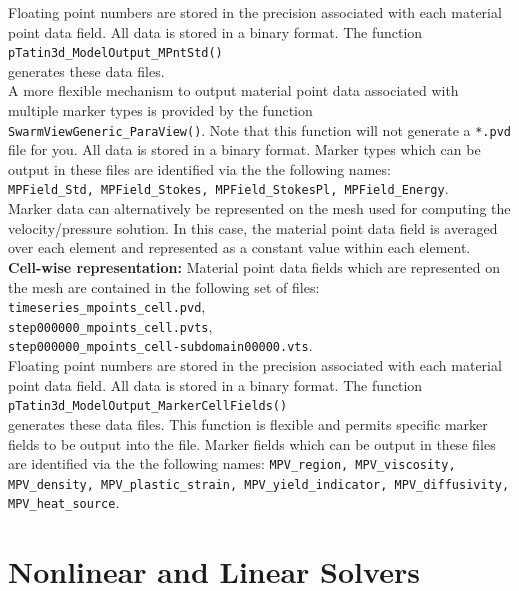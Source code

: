 \documentclass[paper=a4, fontsize=11pt,twoside]{scrartcl}
\newcommand{\unix}[1]{\texttt{\footnotesize #1}}
\begin{document}
{{Floating point numbers are stored in the precision associated with each material point data field. All data is stored in a binary format. The function \\
\unix{pTatin3d\_ModelOutput\_MPntStd()} \\
generates these data files.
\\[8pt]
A more flexible mechanism to output material point data associated with multiple marker types is provided by the function \unix{SwarmViewGeneric\_ParaView()}. Note that this function will not generate a \texttt{*.pvd} file for you.  All data is stored in a binary format. Marker types which can be output in these files are identified via the the following names: \\
\unix{MPField\_Std, MPField\_Stokes, MPField\_StokesPl, MPField\_Energy}.
\\[8pt]
Marker data can alternatively be represented on the mesh used for computing the velocity/pressure solution. 
In this case, the material point data field is averaged over each element and represented as a constant value within each element.
\\[8pt]
{\bf Cell-wise representation:} Material point data fields which are represented on the mesh are contained in the following set of files:\\
\unix{timeseries\_mpoints\_cell.pvd}, \\
\unix{step000000\_mpoints\_cell.pvts}, \\
\unix{step000000\_mpoints\_cell-subdomain00000.vts}. \\
Floating point numbers are stored in the precision associated with each material point data field. All data is stored in a binary format.
The function \\
	\unix{pTatin3d\_ModelOutput\_MarkerCellFields()} \\
generates these data files. This function is flexible and permits specific marker fields to be output into the file. Marker fields which can be output in these files are identified via the the following names:
\unix{MPV\_region, MPV\_viscosity, MPV\_density, MPV\_plastic\_strain, MPV\_yield\_indicator, MPV\_diffusivity, MPV\_heat\_source}.

\newpage
\section{Nonlinear and Linear Solvers}

}}
\end{document}
